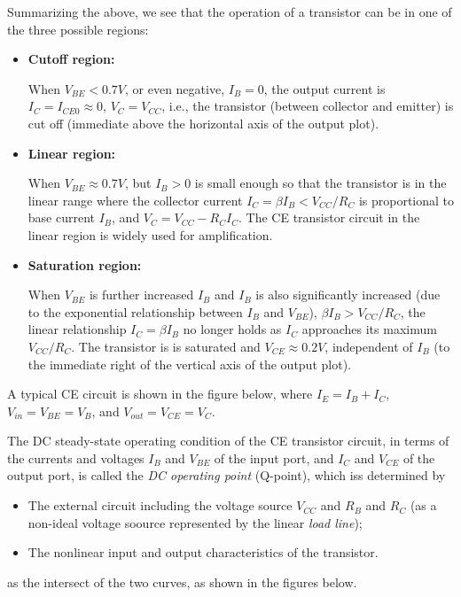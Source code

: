 \documentclass{article}
\begin{document}
Summarizing the above, we see that the operation of a transistor can be in 
one of the three possible regions:
\begin{itemize}
\item {\bf Cutoff region:} 

  When $V_{BE}<0.7V$, or even negative, $I_B=0$, the output current is
  $I_C=I_{CE0} \approx 0$, $V_C=V_{CC}$, i.e., the transistor (between 
  collector and emitter) is cut off (immediate above the horizontal
  axis of the output plot).

\item {\bf Linear region:} 

  When $V_{BE}\approx 0.7V$, but $I_B>0$ is small enough so that the 
  transistor is in the linear range where the collector current 
  $I_C=\beta I_B < V_{CC}/R_C$ is proportional to base current $I_B$, 
  and $V_C=V_{CC}-R_CI_C$. The CE transistor circuit in the linear 
  region is widely used for amplification.

\item {\bf Saturation region:} 

  When $V_{BE}$ is further increased $I_B$ and $I_B$ is also significantly
  increased (due to the exponential relationship between $I_B$ and $V_{BE}$), 
  $\beta I_B > V_{CC}/R_C$, the linear relationship $I_C=\beta I_B$ no longer 
  holds as $I_C$ approaches its maximum $V_{CC}/R_C$. The transistor is 
  is saturated and $V_{CE}\approx 0.2V$, independent of $I_B$ (to the 
  immediate right of the vertical axis of the output plot).

\end{itemize}

A typical CE circuit is shown in the figure below, where $I_E=I_B+I_C$,
$V_{in}=V_{BE}=V_B$, and $V_{out}=V_{CE}=V_C$.


The DC steady-state operating condition of the CE transistor circuit,
in terms of the currents and voltages $I_B$ and $V_{BE}$ of the input 
port, and $I_C$ and $V_{CE}$ of the output port, is called the 
{\em DC operating point} (Q-point), which iss determined by 
\begin{itemize}
\item The external circuit including the voltage source $V_{CC}$ 
  and $R_B$ and $R_C$ (as a non-ideal voltage soource represented 
  by the linear {\em load line});

\item The nonlinear input and output characteristics of the transistor.
\end{itemize}
as the intersect of the two curves, as shown in the figures below.
\end{document}
